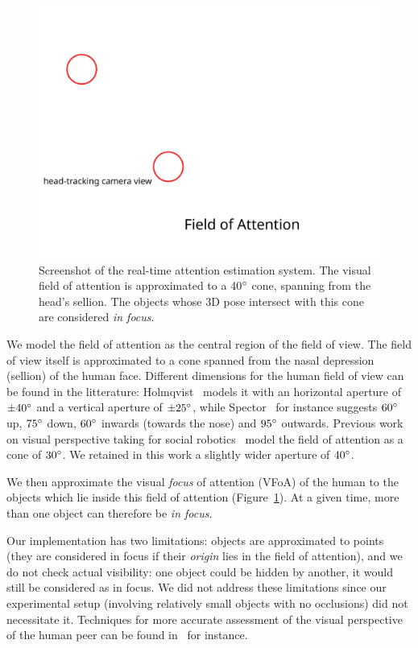 \documentclass{sig-alternate}
\begin{document}
\begin{figure}
    \centering
    \includegraphics[width=0.9\columnwidth]{field_of_attention}
    \caption{\small Screenshot of the real-time attention estimation system. The
    visual field of attention is approximated to a 40$\degree$ cone, spanning
    from the head's sellion. The objects whose 3D pose intersect with this cone are
    considered \emph{in focus}.}

\label{fig:vfoa}
\end{figure}

We model the field of attention as the central region of the field of view.  The
field of view itself is approximated to a cone spanned from the nasal depression
(sellion) of the human face. Different dimensions for the human field of view
can be found in the litterature: Holmqvist~\cite{holmqvist2011eye} models it
with an horizontal aperture of $ \pm 40\degree $ and a vertical aperture of $
\pm 25\degree $, while Spector~\cite{walker1980clinical} for instance suggests
$60\degree$ up, $75\degree$ down, $60\degree$ inwards (towards the nose) and
$95\degree$ outwards.  Previous work on visual perspective taking for social
robotics~\cite{sisbot2011situation} model the field of attention as a cone of
$30\degree$. We retained in this work a slightly wider aperture of $40\degree$.

We then approximate the visual \emph{focus} of attention (VFoA) of the human to
the objects which lie inside this field of attention (Figure~\ref{fig:vfoa}). At
a given time, more than one object can therefore be \emph{in focus}.

Our implementation has two limitations: objects are approximated to points (they
are considered in focus if their \emph{origin} lies in the field of attention),
and we do not check actual visibility: one object could be hidden by another, it
would still be considered as in focus. We did not address these limitations
since our experimental setup (involving relatively small objects with no
occlusions) did not necessitate it. Techniques for more accurate assessment of
the visual perspective of the human peer can be found
in~\cite{sisbot2011situation} for instance.
\end{document}

